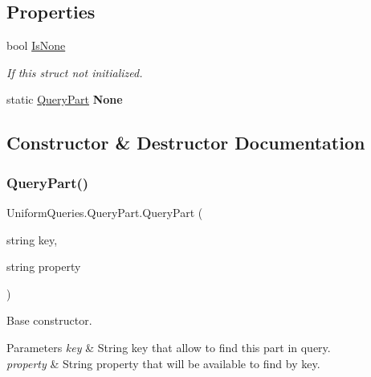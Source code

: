 \subsection*{Properties}
\begin{DoxyCompactItemize}
\item 
bool \mbox{\hyperlink{struct_uniform_queries_1_1_query_part_af380375ca82e9dc2eecf899b5933fe2b}{Is\+None}}
\begin{DoxyCompactList}\small\item\em If this struct not initialized. \end{DoxyCompactList}\item 
\mbox{\label{struct_uniform_queries_1_1_query_part_a5be54faa8b7723167257e930a71457a4}} 
static \mbox{\hyperlink{struct_uniform_queries_1_1_query_part}{Query\+Part}} {\bfseries None}
\end{DoxyCompactItemize}


\subsection{Constructor \& Destructor Documentation}
\mbox{\label{struct_uniform_queries_1_1_query_part_adabbcaa15ccf653f686d4f2bcd39ce09}} 
\subsubsection{\texorpdfstring{Query\+Part()}{QueryPart()}}
{\footnotesize\ttfamily Uniform\+Queries.\+Query\+Part.\+Query\+Part (\begin{DoxyParamCaption}\item[{string}]{key,  }\item[{string}]{property }\end{DoxyParamCaption})}



Base constructor. 


\begin{DoxyParams}{Parameters}
{\em key} & String key that allow to find this part in query.\\
\hline
{\em property} & String property that will be available to find by key.\\
\hline
\end{DoxyParams}


